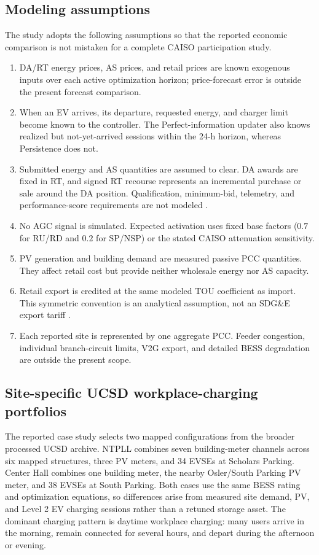 \documentclass[final,5p,times]{elsarticle}
\begin{document}
\subsection{Modeling assumptions}
The study adopts the following assumptions so that the reported economic
comparison is not mistaken for a complete CAISO participation study.
\begin{enumerate}
  \item DA/RT energy prices, AS prices, and retail prices are known exogenous
  inputs over each active optimization horizon; price-forecast error is outside
  the present forecast comparison.
  \item When an EV arrives, its departure, requested energy, and charger limit
  become known to the controller. The Perfect-information updater also
  knows realized but not-yet-arrived sessions within the 24-h horizon, whereas
  Persistence does not.
  \item Submitted energy and AS quantities are assumed to clear. DA awards are
  fixed in RT, and signed RT recourse represents an incremental purchase or
  sale around the DA position. Qualification, minimum-bid, telemetry, and
  performance-score requirements are not modeled \cite{caisoAncillary2026} \cite{caisoDER2026}.
  \item No AGC signal is simulated. Expected activation uses fixed base factors
  ($0.7$ for RU/RD and $0.2$ for SP/NSP) or the stated CAISO attenuation
  sensitivity.
  \item PV generation and building demand are measured passive PCC quantities.
  They affect retail cost but provide neither wholesale energy nor AS capacity.
  \item Retail export is credited at the same modeled TOU coefficient as import.
  This symmetric convention is an analytical assumption, not an SDG\&E export
  tariff \cite{sdgeLargeCommercial2025}.
  \item Each reported site is represented by one aggregate PCC. Feeder congestion,
  individual branch-circuit limits, V2G export, and detailed BESS degradation are
  outside the present scope.
\end{enumerate}

\subsection{Site-specific UCSD workplace-charging portfolios}
The reported case study selects two mapped configurations from the broader processed UCSD archive. NTPLL combines seven building-meter channels across six mapped structures, three PV meters, and 34 EVSEs at Scholars Parking. Center Hall combines one building meter, the nearby Osler/South Parking PV meter, and 38 EVSEs at South Parking. Both cases use the same BESS rating and optimization equations, so differences arise from measured site demand, PV, and Level 2 EV charging sessions rather than a retuned storage asset. The dominant charging pattern is daytime workplace charging: many users arrive in the morning, remain connected for several hours, and depart during the afternoon or evening.
\end{document}
